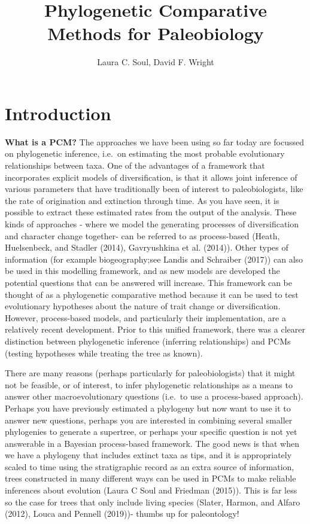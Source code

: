 \documentclass[]{article}
\title{Phylogenetic Comparative Methods for Paleobiology}
\author{Laura C. Soul, David F. Wright}
\date{}
\begin{document}
\maketitle

\section{Introduction}\label{introduction}

\textbf{What is a PCM?} The approaches we have been using so far today
are focussed on phylogenetic inference, i.e.~on estimating the most
probable evolutionary relationships between taxa. One of the advantages
of a framework that incorporates explicit models of diversification, is
that it allows joint inference of various parameters that have
traditionally been of interest to paleobiologists, like the rate of
origination and extinction through time. As you have seen, it is
possible to extract these estimated rates from the output of the
analysis. These kinds of approaches - where we model the generating
processes of diversification and character change together- can be
referred to as process-based (Heath, Huelsenbeck, and Stadler (2014),
Gavryushkina et al. (2014)). Other types of information (for example
biogeography;see Landis and Schraiber (2017)) can also be used in this
modelling framework, and as new models are developed the potential
questions that can be answered will increase. This framework can be
thought of as a phylogenetic comparative method because it can be used
to test evolutionary hypotheses about the nature of trait change or
diversification. However, process-based models, and particularly their
implementation, are a relatively recent development. Prior to this
unified framework, there was a clearer distinction between phylogenetic
inference (inferring relationships) and PCMs (testing hypotheses while
treating the tree as known).

There are many reasons (perhaps particularly for paleobiologists) that
it might not be feasible, or of interest, to infer phylogenetic
relationships as a means to answer other macroevolutionary questions
(i.e.~to use a process-based approach). Perhaps you have previously
estimated a phylogeny but now want to use it to answer new questions,
perhaps you are interested in combining several smaller phylogenies to
generate a supertree, or perhaps your specific question is not yet
answerable in a Bayesian process-based framework. The good news is that
when we have a phylogeny that includes extinct taxa as tips, and it is
appropriately scaled to time using the stratigraphic record as an extra
source of information, trees constructed in many different ways can be
used in PCMs to make reliable inferences about evolution (Laura C Soul
and Friedman (2015)). This is far less so the case for trees that only
include living species (Slater, Harmon, and Alfaro (2012), Louca and
Pennell (2019))- thumbs up for paleontology!
\end{document}

